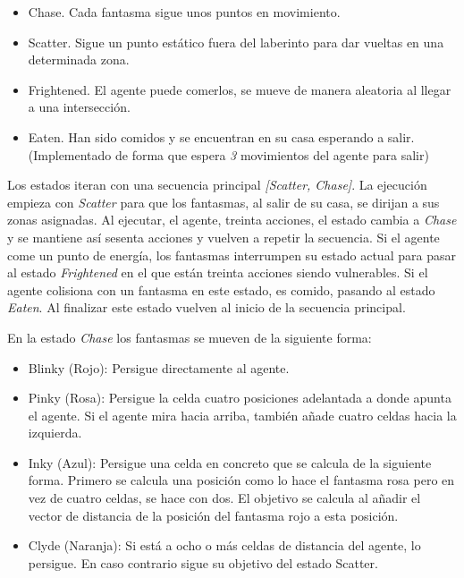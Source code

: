 		\begin{itemize}
			\item Chase. Cada fantasma sigue unos puntos en movimiento.
			\vspace*{-0.3cm}
			\item Scatter. Sigue un punto estático fuera del laberinto para dar vueltas en una determinada zona.
			\vspace*{-0.3cm}
			\item Frightened. El agente puede comerlos, se mueve de manera aleatoria al llegar a una intersección.
			\vspace*{-0.3cm}
			\item Eaten. Han sido comidos y se encuentran en su casa esperando a salir. (Implementado de forma que espera \textit{3} movimientos del agente para salir)
		\end{itemize} 
		
		Los estados iteran con una secuencia principal \textit{[Scatter, Chase]}. La ejecución empieza con \textit{Scatter} para que los fantasmas, al salir de su casa, se dirijan a sus zonas asignadas. Al ejecutar, el agente, treinta acciones, el estado cambia a \textit{Chase} y se mantiene así sesenta acciones y vuelven a repetir la secuencia. Si el agente come un punto de energía, los fantasmas interrumpen su estado actual para pasar al estado \textit{Frightened} en el que están treinta acciones siendo vulnerables. Si el agente colisiona con un fantasma en este estado, es comido, pasando al estado \textit{Eaten}. Al finalizar este estado vuelven al inicio de la secuencia principal.
		
		\newpage
		
		\begin{flushleft}
			En la estado \textit{Chase} los fantasmas se mueven de la siguiente forma:
		\end{flushleft}
		
		\vspace{-0.9cm}
		\begin{itemize}
			\item Blinky (Rojo): Persigue directamente al agente.
			\vspace*{-0.3cm}
			\item Pinky (Rosa): Persigue la celda cuatro posiciones adelantada a donde apunta el agente. Si el agente mira hacia arriba, también añade cuatro celdas hacia la izquierda.
			\vspace*{-0.3cm}
			\item Inky (Azul): Persigue una celda en concreto que se calcula de la siguiente forma. Primero se calcula una posición como lo hace el fantasma rosa pero en vez de cuatro celdas, se hace con dos. El objetivo se calcula al añadir el vector de distancia de la posición del fantasma rojo a esta posición.
			\vspace*{-0.3cm}
			\item Clyde (Naranja): Si está a ocho o más celdas de distancia del agente, lo persigue. En caso contrario sigue su objetivo del estado Scatter.
		\end{itemize}
		
